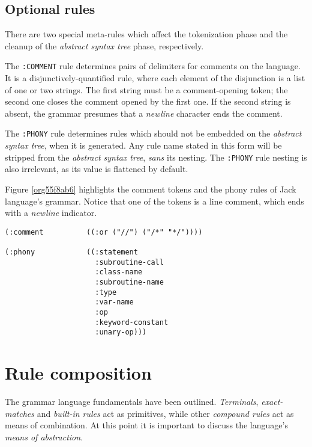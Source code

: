 \documentclass[a4paper,11pt,oneside]{article}
\begin{document}
\subsection*{Optional rules}
\label{sec:org632e829}

There are two special meta-rules which affect the tokenization phase and
the cleanup of the \emph{abstract syntax tree} phase, respectively.

The \texttt{:COMMENT} rule determines pairs of delimiters for comments on the
language. It is a disjunctively-quantified rule, where each element of
the disjunction is a list of one or two strings. The first string must
be a comment-opening token; the second one closes the comment opened
by the first one. If the second string is absent, the grammar presumes
that a \emph{newline} character ends the comment.

The \texttt{:PHONY} rule determines rules which should not be embedded on the
\emph{abstract syntax tree}, when it is generated. Any rule name stated in
this form will be stripped from the \emph{abstract syntax tree}, \emph{sans} its
nesting. The \texttt{:PHONY} rule nesting is also irrelevant, as its value is
flattened by default.

Figure \ref{org55f8ab6} highlights the comment tokens and the phony
rules of Jack language's grammar. Notice that one of the tokens is a
line comment, which ends with a \emph{newline} indicator.

\begin{verbatim}
(:comment          ((:or ("//") ("/*" "*/"))))

(:phony            ((:statement
                     :subroutine-call
                     :class-name
                     :subroutine-name
                     :type
                     :var-name
                     :op
                     :keyword-constant
                     :unary-op)))
\end{verbatim}

\section{Rule composition}
\label{sec:orgaf7e012}

The grammar language fundamentals have been outlined. \emph{Terminals},
\emph{exact-matches} and \emph{built-in rules} act as primitives, while other
\emph{compound rules} act as means of combination. At this point it is
important to discuss the language's \emph{means of abstraction}.
\end{document}
